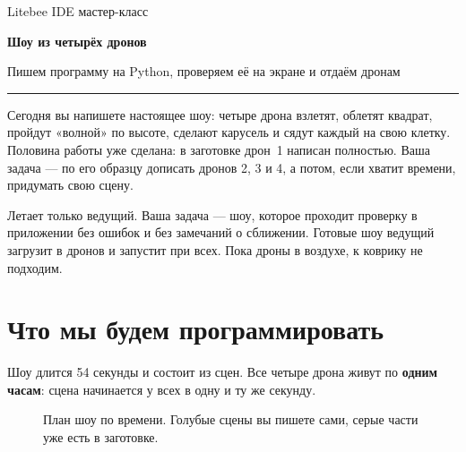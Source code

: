 \documentclass[a4paper,11pt]{scrartcl}
\begin{document}
\begin{center}
  {\sffamily\small\color{inkgray}Litebee IDE \textbullet{} мастер-класс}\par\vspace{6pt}
  {\sffamily\bfseries\fontsize{26}{30}\selectfont\color{accent}Шоу из четырёх дронов}\par\vspace{6pt}
  {\sffamily\large\color{ink}Пишем программу на Python, проверяем её на экране и отдаём дронам}\par\vspace{8pt}
  \textcolor{accent}{\rule{3.2cm}{1.6pt}}
\end{center}
\vspace{6pt}

Сегодня вы напишете настоящее шоу: четыре дрона взлетят, облетят квадрат, пройдут «волной» по высоте, сделают карусель и сядут каждый на свою клетку. Половина работы уже сделана: в заготовке дрон~1 написан полностью. Ваша задача — по его образцу дописать дронов 2, 3 и 4, а потом, если хватит времени, придумать свою сцену.

\begin{opasno}
Летает только ведущий. Ваша задача — шоу, которое проходит проверку в приложении без ошибок и без замечаний о сближении. Готовые шоу ведущий загрузит в дронов и запустит при всех. Пока дроны в воздухе, к коврику не подходим.
\end{opasno}

\section{Что мы будем программировать}

Шоу длится 54 секунды и состоит из сцен. Все четыре дрона живут по \textbf{одним часам}: сцена начинается у всех в одну и ту же секунду.

\begin{figure}[H]
\centering
{}
\caption{План шоу по времени. Голубые сцены вы пишете сами, серые части уже есть в заготовке.}
\end{figure}
\end{document}
